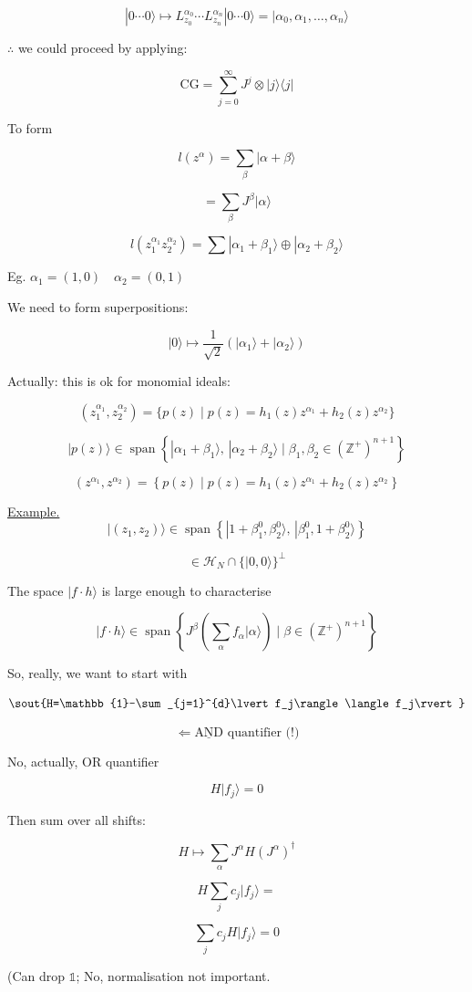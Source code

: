 \[
|0\cdots 0\rangle\longmapsto
L_{z_0}^{\alpha_0}\cdots L_{z_n}^{\alpha_n}|0\cdots 0\rangle
=|\alpha_0,\alpha_1,\ldots,\alpha_n\rangle
\]

$\therefore$ we could proceed by applying:

\[
\mathrm{CG}=\sum_{j=0}^{\infty}J^j\otimes |j\rangle\langle j|
\]

To form

\[
l(z^\alpha)=\sum_\beta|\alpha+\beta\rangle
\]

\[
=\sum_\beta J^\beta|\alpha\rangle
\]

\[
l(z_1^{\alpha_1}z_2^{\alpha_2})
=\sum |\alpha_1+\beta_1\rangle\oplus|\alpha_2+\beta_2\rangle
\]

Eg. $\alpha_1=(1,0)\quad \alpha_2=(0,1)$

We need to form superpositions:

\[
|0\rangle\longmapsto\frac{1}{\sqrt{2}}
\left(|\alpha_1\rangle+|\alpha_2\rangle\right)
\]

Actually: this is ok for monomial ideals:

\[
(z_1^{\alpha_1},z_2^{\alpha_2})
=\{p(z)\mid p(z)=h_1(z)z^{\alpha_1}+h_2(z)z^{\alpha_2}\}
\]

\[
|p(z)\rangle\in\operatorname{span}
\left\{
|\alpha_1+\beta_1\rangle,\,
|\alpha_2+\beta_2\rangle
\mid \beta_1,\beta_2\in(\mathbb{Z}^+)^{n+1}
\right\}
\]

\[
(z^{\alpha_1},z^{\alpha_2})
=
\left\{p(z)\mid p(z)=h_1(z)z^{\alpha_1}+h_2(z)z^{\alpha_2}\right\}
\]

\underline{Example.}\quad
\[
|(z_1,z_2)\rangle\in\operatorname{span}
\left\{
|1+\beta_1^0,\beta_2^0\rangle,\,
|\beta_1^0,1+\beta_2^0\rangle
\right\}
\]

\[
\in\mathcal{H}_N\cap\{|0,0\rangle\}^{\perp}
\]

The space $|f\cdot h\rangle$ is large enough to characterise

\[
|f\cdot h\rangle\in\operatorname{span}
\left\{
J^\beta\left(\sum_\alpha f_\alpha|\alpha\rangle\right)
\mid \beta\in(\mathbb{Z}^+)^{n+1}
\right\}
\]

So, really, we want to start with

\[
\sout{H=\mathbb{1}-\sum_{j=1}^{d}\lvert f_j\rangle\langle f_j\rvert}
\]

\[
\Longleftarrow \underline{\text{AND}}\text{ quantifier (!)}
\]

No, actually, OR quantifier

\[
H\lvert f_j\rangle=0
\]

Then sum over all shifts:

\[
H\longmapsto\sum_\alpha J^\alpha H(J^\alpha)^\dagger
\]

\[
H\sum_j c_j\lvert f_j\rangle=
\]

\[
\sum_j c_j H\lvert f_j\rangle=0
\]

(Can drop $\mathbb{1}$; No, normalisation not important.
